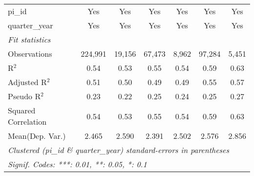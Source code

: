 \begin{tabular}{lcccccc}
   pi\_id                                                     & Yes           & Yes           & Yes           & Yes           & Yes           & Yes\\  
   quarter\_year                                              & Yes           & Yes           & Yes           & Yes           & Yes           & Yes\\  
   \midrule
   \emph{Fit statistics}\\
   Observations                                               & 224,991       & 19,156        & 67,473        & 8,962         & 97,284        & 5,451\\  
   R$^2$                                                      & 0.54          & 0.53          & 0.55          & 0.54          & 0.59          & 0.63\\  
   Adjusted R$^2$                                             & 0.51          & 0.50          & 0.49          & 0.49          & 0.55          & 0.57\\  
   Pseudo R$^2$                                               & 0.23          & 0.22          & 0.25          & 0.24          & 0.25          & 0.27\\  
   Squared Correlation                                        & 0.54          & 0.53          & 0.55          & 0.54          & 0.59          & 0.63\\  
Mean(Dep. Var.) & 2.465 & 2.590 & 2.391 & 2.502 & 2.576 & 2.856 \\
   \midrule \midrule
   \multicolumn{7}{l}{\emph{Clustered (pi\_id \& quarter\_year) standard-errors in parentheses}}\\
   \multicolumn{7}{l}{\emph{Signif. Codes: ***: 0.01, **: 0.05, *: 0.1}}\\
\end{tabular}
\par\endgroup
